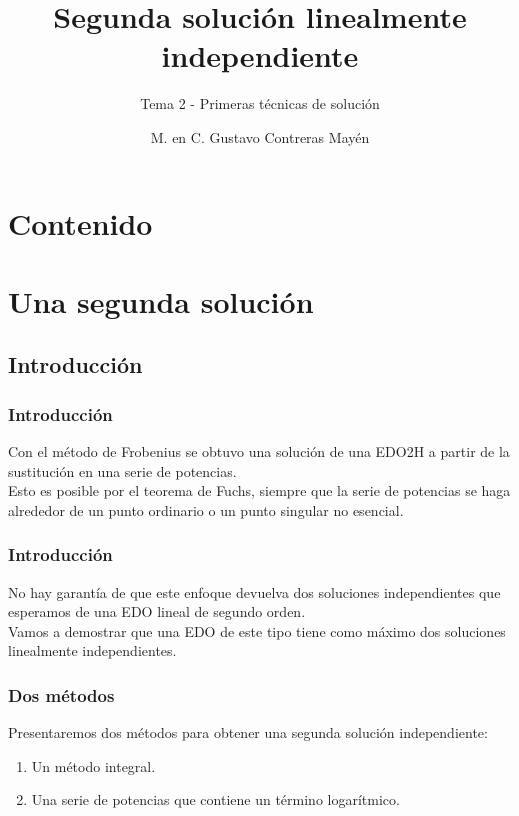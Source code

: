 \documentclass[12pt]{beamer}
\date{}
\title{\large{Segunda solución linealmente independiente}}
\subtitle{Tema 2 - Primeras técnicas de solución}
\author{M. en C. Gustavo Contreras Mayén}
\begin{document}
\maketitle
\fontsize{14}{14}\selectfont
{}

\section*{Contenido}

\section{Una segunda solución}
\subsection{Introducción}

\begin{frame}
\frametitle{Introducción}
Con el método de Frobenius se obtuvo una solución de una EDO2H a partir de la sustitución en una serie de potencias.
\\
\bigskip
\pause
Esto es posible por el teorema de Fuchs, siempre que la serie de potencias se haga alrededor de un punto ordinario o un punto singular no esencial.
\end{frame}
\begin{frame}
\frametitle{Introducción}
No hay garantía de que este enfoque devuelva dos soluciones independientes que esperamos de una EDO lineal de segundo orden.
\\
\bigskip
\pause
Vamos a demostrar que una EDO de este tipo tiene como máximo dos soluciones linealmente independientes. 
\end{frame}
\begin{frame}
\frametitle{Dos métodos }
Presentaremos dos métodos para obtener una segunda solución independiente:
\pause
{}
\begin{enumerate}[<+->]
\item Un método integral.
\item Una serie de potencias que contiene un término logarítmico.
\end{enumerate}
\end{frame}
\end{document}
